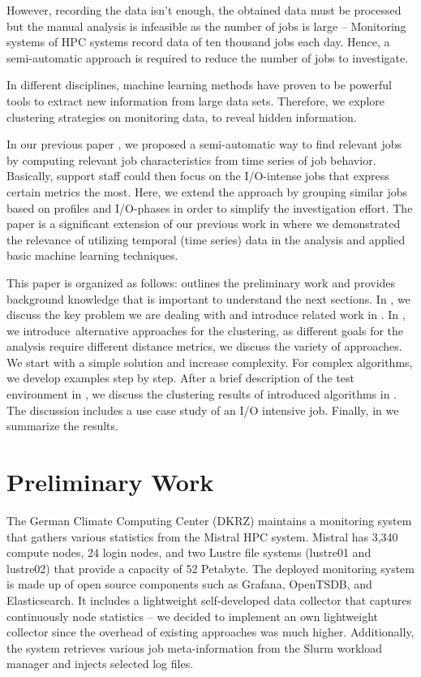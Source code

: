 \documentclass{jhps}
\begin{document}
However, recording the data isn't enough, the obtained data must be processed but the manual analysis is infeasible as the number of jobs is large -- Monitoring systems of HPC systems record data of ten thousand jobs each day.
Hence, a semi-automatic approach is required to reduce the number of jobs to investigate.

In different disciplines, machine learning methods have proven to be powerful tools to extract new information from large data sets.
Therefore, we explore clustering strategies on monitoring data, to reveal hidden information.

In our previous paper \cite{iocats2020}, we proposed a semi-automatic way to find relevant jobs by computing relevant job characteristics from time series of job behavior.
Basically, support staff could then focus on the I/O-intense jobs that express certain metrics the most.
Here, we extend the approach by grouping similar jobs based on profiles and I/O-phases in order to simplify the investigation effort.
The paper is a significant extension of our previous work in \cite{itb2020} where we demonstrated the relevance of utilizing temporal (time series) data in the analysis and applied basic machine learning techniques.

This paper is organized as follows:  outlines the preliminary work and provides background knowledge that is important to understand the next sections.
In , we discuss the key problem we are dealing with and introduce related work in .
In , we introduce\ alternative approaches for the clustering, as different goals for the analysis require different distance metrics, we discuss the variety of approaches.
We start with a simple solution and increase complexity.
For complex algorithms, we develop examples step by step.
After a brief description of the test environment in , we discuss the clustering results of introduced algorithms in .
The discussion includes a use case study of an I/O intensive job.
Finally, in  we summarize the results.

\section{Preliminary Work}%
\label{sec:preliminary_work}
The German Climate Computing Center (DKRZ) maintains a monitoring system that gathers various statistics from the Mistral HPC system.
Mistral has 3,340 compute nodes, 24 login nodes, and two Lustre file systems (lustre01 and lustre02) that provide a capacity of 52 Petabyte.
The deployed monitoring system is made up of open source components such as Grafana, OpenTSDB, and Elasticsearch.
It includes a lightweight self-developed data collector that captures continuously node statistics -- we decided to implement an own lightweight collector since the overhead of existing approaches was much higher.
Additionally, the system retrieves various job meta-information from the Slurm workload manager and injects selected log files.
\end{document}
